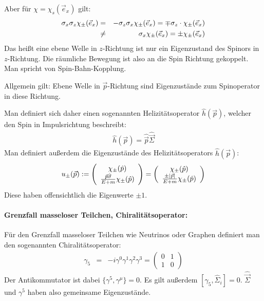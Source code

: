 Aber für $\chi = \chi_{s} (\vec e_x)$ gilt:
\begin{eqnarray*} 
	\sigma_x\sigma_z \chi_\pm(\vec e_x) &=& - \sigma_z\sigma_x \chi_\pm(\vec e_x) = \mp\sigma_z \cdot \chi_\pm(\vec e_x)
	\\
&\neq& \sigma_x\chi_\pm(\vec e_x) = \pm\chi_\pm(\vec e_x)
\end{eqnarray*}
Das heißt eine ebene Welle in $z$-Richtung ist nur ein Eigenzustand des Spinors in $z$-Richtung. Die räumliche Bewegung ist also an die Spin Richtung gekoppelt. Man spricht von Spin-Bahn-Kopplung. 

Allgemein gilt: Ebene Welle in $\vec{p}$-Richtung sind Eigenzustände zum Spinoperator in diese Richtung. 

Man definiert sich daher einen sogenannten Helizitätsoperator $\hat{h}(\vec{p})$, welcher den Spin in Impulsrichtung beschreibt: 
\begin{eqnarray*}
\hat{h}(\vec p) = \hat{\vec{p}} \hat{\vec{\Sigma}}
\end{eqnarray*}
Man definiert außerdem die Eigenzustände des Helizitätsoperators $\hat{h}(\vec{p})$:  
\begin{eqnarray*}
u_\pm(\vec p) := \left(\begin{array}c \chi_\pm (\hat p)\\\frac{\vec p\hat{\vec \sigma}}{E+m}\chi_\pm(\hat p)\end{array}\ri) = \left(\begin{array}c\chi_\pm(\hat p)\\\frac{\pm\left|\vec p\ri|}{E+m}\chi_\pm(\hat p)\end{array}\ri)
\end{eqnarray*}
Diese haben offensichtlich die Eigenwerte $\pm 1$.

\paragraph{Grenzfall masseloser Teilchen, Chiralitätsoperator: }
Für den Grenzfall masseloser Teilchen wie Neutrinos oder Graphen definiert man den sogenannten Chiralitätsoperator: 
\begin{eqnarray*}
	\gamma_5 &=& -i \gamma^0\gamma^1\gamma^2\gamma^3= \left(\!\!\begin{array}{cc} 0&1 \\ 1&0 \end{array}\!\!\right)
\end{eqnarray*}
Der Antikommutator ist dabei $\{\gamma^5,\gamma^{\mu}\}=0$. Es gilt außerdem $[\gamma_5,\hat{\Sigma}_i]=0$. $\hat{\vec{\Sigma}}$ und $\gamma^5$ haben also gemeinsame Eigenzustände. 


